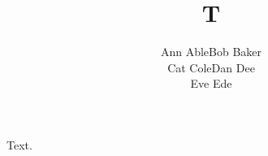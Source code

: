 \documentclass{article}
\begin{document}
\title{T}
\author{Ann Able\quad Bob Baker\\ Cat Cole\quad Dan Dee\\ Eve Ede}
\maketitle
Text.
\end{document}
